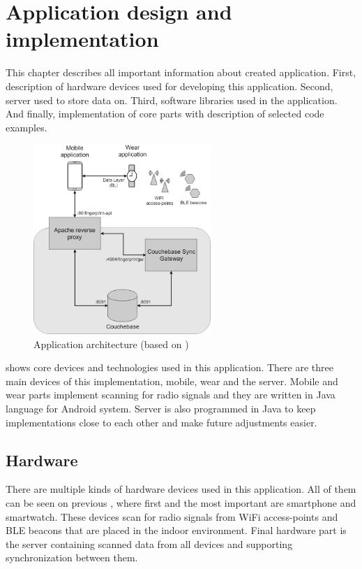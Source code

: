 \chapter{Application design and implementation}\label{sec:ApplicationDesingAndImplementation}
This chapter describes all important information about created application. First, description of hardware devices used for developing this application. Second, server used to store data on. Third, software libraries used in the application. And finally, implementation of core parts with description of selected code examples.

\begin{figure}[H]
	\begin{centering}
		\includegraphics[width=0.6\textwidth]{img/server_architecture}
		\par\end{centering}
	\caption{Application architecture (based on \cite{IILUBLEB})}
	\label{fig01c05}
\end{figure}

 shows core devices and technologies used in this application. There are three main devices of this implementation, mobile, wear and the server. Mobile and wear parts implement scanning for radio signals and they are written in Java language for Android system. Server is also programmed in Java to keep implementations close to each other and make future adjustments easier.

\section{Hardware}\label{sec:Hardware}
There are multiple kinds of hardware devices used in this application. All of them can be seen on previous , where first and the most important are smartphone and smartwatch. These devices scan for radio signals from WiFi access-points and BLE beacons that are placed in the indoor environment. Final hardware part is the server containing scanned data from all devices and supporting synchronization between them.


